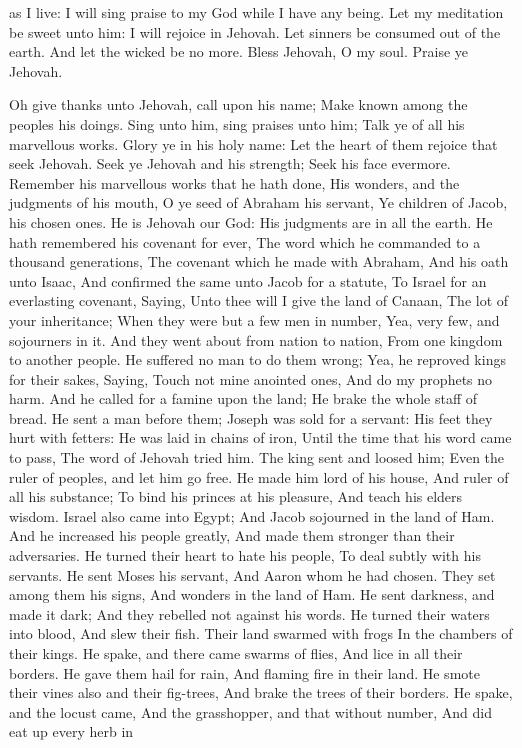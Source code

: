 as I live: I will sing praise to my God while I have any being.  Let my meditation be sweet unto him: I will rejoice in Jehovah.  Let sinners be consumed out of the earth. And let the wicked be no more. Bless Jehovah, O my soul. Praise ye Jehovah. 

Oh give thanks unto Jehovah, call upon his name; Make known among the peoples his doings.  Sing unto him, sing praises unto him; Talk ye of all his marvellous works.  Glory ye in his holy name: Let the heart of them rejoice that seek Jehovah.  Seek ye Jehovah and his strength; Seek his face evermore.  Remember his marvellous works that he hath done, His wonders, and the judgments of his mouth,  O ye seed of Abraham his servant, Ye children of Jacob, his chosen ones.  He is Jehovah our God: His judgments are in all the earth.  He hath remembered his covenant for ever, The word which he commanded to a thousand generations,  The covenant which he made with Abraham, And his oath unto Isaac,  And confirmed the same unto Jacob for a statute, To Israel for an everlasting covenant,  Saying, Unto thee will I give the land of Canaan, The lot of your inheritance;  When they were but a few men in number, Yea, very few, and sojourners in it.  And they went about from nation to nation, From one kingdom to another people.  He suffered no man to do them wrong; Yea, he reproved kings for their sakes,  Saying, Touch not mine anointed ones, And do my prophets no harm.  And he called for a famine upon the land; He brake the whole staff of bread.  He sent a man before them; Joseph was sold for a servant:  His feet they hurt with fetters: He was laid in chains of iron,  Until the time that his word came to pass, The word of Jehovah tried him.  The king sent and loosed him; Even the ruler of peoples, and let him go free.  He made him lord of his house, And ruler of all his substance;  To bind his princes at his pleasure, And teach his elders wisdom.  Israel also came into Egypt; And Jacob sojourned in the land of Ham.  And he increased his people greatly, And made them stronger than their adversaries.  He turned their heart to hate his people, To deal subtly with his servants.  He sent Moses his servant, And Aaron whom he had chosen.  They set among them his signs, And wonders in the land of Ham.  He sent darkness, and made it dark; And they rebelled not against his words.  He turned their waters into blood, And slew their fish.  Their land swarmed with frogs In the chambers of their kings.  He spake, and there came swarms of flies, And lice in all their borders.  He gave them hail for rain, And flaming fire in their land.  He smote their vines also and their fig-trees, And brake the trees of their borders.  He spake, and the locust came, And the grasshopper, and that without number,  And did eat up every herb in 